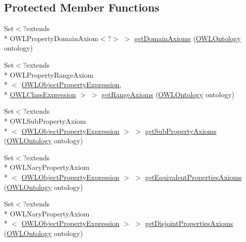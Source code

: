 \subsection*{Protected Member Functions}
\begin{DoxyCompactItemize}
\item 
Set$<$?extends \\*
O\-W\-L\-Property\-Domain\-Axiom$<$?$>$ $>$ \hyperlink{classuk_1_1ac_1_1manchester_1_1cs_1_1owl_1_1owlapi_1_1_o_w_l_object_property_expression_impl_a6f8241bd0e7f843f3eacde6c744cc761}{get\-Domain\-Axioms} (\hyperlink{interfaceorg_1_1semanticweb_1_1owlapi_1_1model_1_1_o_w_l_ontology}{O\-W\-L\-Ontology} ontology)
\item 
Set$<$?extends \\*
O\-W\-L\-Property\-Range\-Axiom\\*
$<$ \hyperlink{interfaceorg_1_1semanticweb_1_1owlapi_1_1model_1_1_o_w_l_object_property_expression}{O\-W\-L\-Object\-Property\-Expression}, \\*
\hyperlink{interfaceorg_1_1semanticweb_1_1owlapi_1_1model_1_1_o_w_l_class_expression}{O\-W\-L\-Class\-Expression} $>$ $>$ \hyperlink{classuk_1_1ac_1_1manchester_1_1cs_1_1owl_1_1owlapi_1_1_o_w_l_object_property_expression_impl_a16670d59c0533c95f428b66952621a7e}{get\-Range\-Axioms} (\hyperlink{interfaceorg_1_1semanticweb_1_1owlapi_1_1model_1_1_o_w_l_ontology}{O\-W\-L\-Ontology} ontology)
\item 
Set$<$?extends \\*
O\-W\-L\-Sub\-Property\-Axiom\\*
$<$ \hyperlink{interfaceorg_1_1semanticweb_1_1owlapi_1_1model_1_1_o_w_l_object_property_expression}{O\-W\-L\-Object\-Property\-Expression} $>$ $>$ \hyperlink{classuk_1_1ac_1_1manchester_1_1cs_1_1owl_1_1owlapi_1_1_o_w_l_object_property_expression_impl_a5bf99844c1ca106123dfbfa864b7d80a}{get\-Sub\-Property\-Axioms} (\hyperlink{interfaceorg_1_1semanticweb_1_1owlapi_1_1model_1_1_o_w_l_ontology}{O\-W\-L\-Ontology} ontology)
\item 
Set$<$?extends \\*
O\-W\-L\-Nary\-Property\-Axiom\\*
$<$ \hyperlink{interfaceorg_1_1semanticweb_1_1owlapi_1_1model_1_1_o_w_l_object_property_expression}{O\-W\-L\-Object\-Property\-Expression} $>$ $>$ \hyperlink{classuk_1_1ac_1_1manchester_1_1cs_1_1owl_1_1owlapi_1_1_o_w_l_object_property_expression_impl_afcd8d77365deb8f5947e82a549462823}{get\-Equivalent\-Properties\-Axioms} (\hyperlink{interfaceorg_1_1semanticweb_1_1owlapi_1_1model_1_1_o_w_l_ontology}{O\-W\-L\-Ontology} ontology)
\item 
Set$<$?extends \\*
O\-W\-L\-Nary\-Property\-Axiom\\*
$<$ \hyperlink{interfaceorg_1_1semanticweb_1_1owlapi_1_1model_1_1_o_w_l_object_property_expression}{O\-W\-L\-Object\-Property\-Expression} $>$ $>$ \hyperlink{classuk_1_1ac_1_1manchester_1_1cs_1_1owl_1_1owlapi_1_1_o_w_l_object_property_expression_impl_a426b7968d04e248ea86eefb771865a81}{get\-Disjoint\-Properties\-Axioms} (\hyperlink{interfaceorg_1_1semanticweb_1_1owlapi_1_1model_1_1_o_w_l_ontology}{O\-W\-L\-Ontology} ontology)
\end{DoxyCompactItemize}
